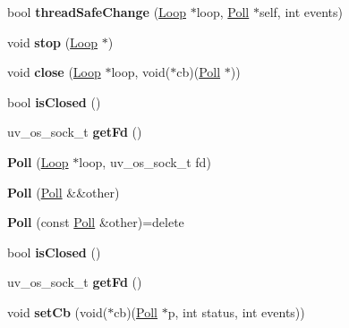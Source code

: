 \begin{DoxyCompactItemize}
bool {\bfseries thread\+Safe\+Change} (\mbox{\hyperlink{struct_loop}{Loop}} $\ast$loop, \mbox{\hyperlink{struct_poll}{Poll}} $\ast$self, int events)
\item 
\mbox{\label{struct_poll_a817979c43bf628ef4a12e11d0a87988c}} 
void {\bfseries stop} (\mbox{\hyperlink{struct_loop}{Loop}} $\ast$)
\item 
\mbox{\label{struct_poll_ac300fe377eb859743d91014acedd3168}} 
void {\bfseries close} (\mbox{\hyperlink{struct_loop}{Loop}} $\ast$loop, void($\ast$cb)(\mbox{\hyperlink{struct_poll}{Poll}} $\ast$))
\item 
\mbox{\label{struct_poll_a613e86c977bb7ea71eacfb5568bc2138}} 
bool {\bfseries is\+Closed} ()
\item 
\mbox{\label{struct_poll_a60c488e68925693818f25dfe55dc8541}} 
uv\+\_\+os\+\_\+sock\+\_\+t {\bfseries get\+Fd} ()
\item 
\mbox{\label{struct_poll_aade8fc2874809b30916f01da7f25e311}} 
{\bfseries Poll} (\mbox{\hyperlink{struct_loop}{Loop}} $\ast$loop, uv\+\_\+os\+\_\+sock\+\_\+t fd)
\item 
\mbox{\label{struct_poll_a4161e1405b5bdad948147a5114aeaf23}} 
{\bfseries Poll} (\mbox{\hyperlink{struct_poll}{Poll}} \&\&other)
\item 
\mbox{\label{struct_poll_a1b229e0f705d78582a9e4ccb2e5faecf}} 
{\bfseries Poll} (const \mbox{\hyperlink{struct_poll}{Poll}} \&other)=delete
\item 
\mbox{\label{struct_poll_a613e86c977bb7ea71eacfb5568bc2138}} 
bool {\bfseries is\+Closed} ()
\item 
\mbox{\label{struct_poll_a60c488e68925693818f25dfe55dc8541}} 
uv\+\_\+os\+\_\+sock\+\_\+t {\bfseries get\+Fd} ()
\item 
\mbox{\label{struct_poll_a3ddbb71196969fe413d3cf1839614007}} 
void {\bfseries set\+Cb} (void($\ast$cb)(\mbox{\hyperlink{struct_poll}{Poll}} $\ast$p, int status, int events))
\item 
\mbox{\label{struct_poll_aee1dc4611ed13e45815e9f6f5e9c8de6}} 

\end{DoxyCompactItemize}

